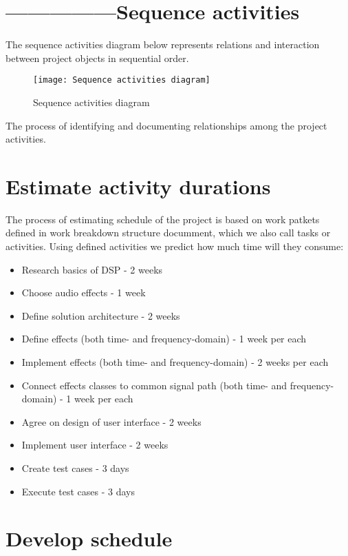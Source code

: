 \documentclass[12pt]{article}
\begin{document}
\section{---------------Sequence activities}

	The sequence activities diagram below represents relations and interaction between project objects in sequential order. 
	
	\begin{figure}[H]
		\texttt{[image: Sequence activities diagram]}
		\caption{Sequence activities diagram}
	\end{figure}

The process of identifying and documenting relationships among the project activities.

\section{Estimate activity durations}

	The process of estimating schedule of the project is based on work patkets defined in work breakdown structure documment, which we also call tasks or activities. Using defined activities we predict how much time will they consume:
	
	\begin{itemize}
	\item Research basics of DSP - 2 weeks
	\item Choose audio effects - 1 week
	\item Define solution architecture - 2 weeks
	\item Define effects (both time- and frequency-domain) - 1 week per each
	\item Implement effects (both time- and frequency-domain) - 2 weeks per each
	\item Connect effects classes to common signal path (both time- and frequency-domain) - 1 week per each
	\item Agree on design of user interface - 2 weeks
	\item Implement user interface - 2 weeks
	\item Create test cases - 3 days
	\item Execute test cases - 3 days
	\end{itemize}

\section{Develop schedule}
\end{document}
